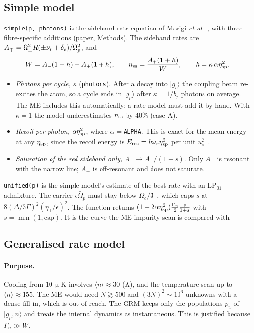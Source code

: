 \documentclass[11pt,a4paper]{article}
\newcommand{\ket}[1]{|#1\rangle}
\newcommand{\gp}{\ket{g_p}}
\newcommand{\gc}{\ket{g_c}}
\newcommand{\Om}{\Omega}
\newcommand{\etap}{\eta_\perp}
\newcommand{\code}[1]{\texttt{#1}}
\newcommand{\SI}[2]{\ensuremath{#1\,\mathrm{#2}}}
\begin{document}
\subsection{Simple model}
\label{sec:simple}
\code{simple(p, photons)} is the sideband rate equation of Morigi \emph{et al.}~\cite{morigi2000}, with three fibre-specific additions (paper, Methods). The sideband rates are $A_\mp=\Om_\perp^2R(\pm\nu_r+\delta_{\rm e})/\Om_p^2$, and
\begin{equation}
  W=A_-(1-h)-A_+(1+h),\qquad n_{\rm ss}=\frac{A_+(1+h)}{W},\qquad h=\kappa\,\alpha\eta_{\rm sp}^2 .
\end{equation}
\begin{itemize}
\item[(i)] \emph{Photons per cycle,} $\kappa$ (\code{photons}). After a decay into $\gc$ the coupling beam re-excites the atom, so a cycle ends in $\gp$ after $\kappa=1/b_p$ photons on average. The ME includes this automatically; a rate model must add it by hand. With $\kappa=1$ the model underestimates $n_{\rm ss}$ by 40\% (case A).
\item[(ii)] \emph{Recoil per photon,} $\alpha\eta_{\rm sp}^2$, where $\alpha=$\code{ALPHA}. This is exact for the mean energy at any $\eta_{\rm sp}$, since the recoil energy is $E_{\rm rec}=\hbar\omega_r\eta_{\rm sp}^2$ per unit $u_x^2$~\cite{leibfried2003}.
\item[(iii)] \emph{Saturation of the red sideband only,} $A_-\to A_-/(1+s)$. Only $A_-$ is resonant with the narrow line; $A_+$ is off-resonant and does not saturate.
\end{itemize}
\code{unified(p)} is the simple model's estimate of the best rate with an LP$_{01}$ admixture. The carrier $\epsilon\bar\Om_p$ must stay below $\Om_c/3$~\cite{morigi2003}, which caps $s$ at $8(\Delta/3\Gamma)^2(\etap/\epsilon)^2$. The function returns $(1-2\alpha\eta_{\rm sp}^2)\tfrac{\Gamma_n}2\tfrac{s}{1+s}$ with $s=\min(1,\text{cap})$. It is the curve the ME impurity scan is compared with.

\subsection{Generalised rate model}
\label{sec:grm}
\paragraph{Purpose.} Cooling from \SI{10}{\upmu K} involves $\langle n\rangle\approx30$ (A), and the temperature scan up to $\langle n\rangle\approx155$. The ME would need $N\gtrsim500$ and $(3N)^2\sim10^6$ unknowns with a dense fill-in, which is out of reach. The GRM keeps only the populations $p_n$ of $\ket{g_p,n}$ and treats the internal dynamics as instantaneous. This is justified because $\Gamma_n\gg W$.
\end{document}
